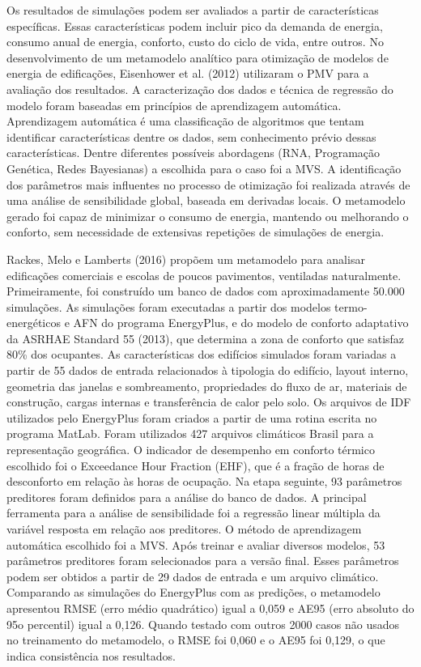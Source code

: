 \documentclass[brazil,hardcopy,openany,a5paper]{ufscthesis}
\begin{document}
	Os resultados de simulações podem ser avaliados a partir de características específicas. Essas características podem incluir pico da demanda de energia, consumo anual de energia, conforto, custo do ciclo de vida, entre outros. No desenvolvimento de um metamodelo analítico para otimização de modelos de energia de edificações, Eisenhower et al. (2012) utilizaram o PMV para a avaliação dos resultados. A caracterização dos dados e técnica de regressão do modelo foram baseadas em princípios de aprendizagem automática. Aprendizagem automática é uma classificação de algoritmos que tentam identificar características dentre os dados, sem conhecimento prévio
	dessas características. Dentre diferentes possíveis abordagens (RNA, Programação Genética, Redes Bayesianas) a escolhida para o caso foi a MVS. 
	A identificação dos parâmetros mais influentes no processo de otimização foi realizada através de uma análise de sensibilidade global, baseada em derivadas locais. O metamodelo gerado foi capaz de minimizar o consumo de energia, mantendo ou melhorando o conforto, sem necessidade de extensivas repetições de simulações de energia.
	
	Rackes, Melo e Lamberts (2016) propõem um metamodelo para analisar edificações comerciais e escolas de poucos pavimentos, ventiladas naturalmente. Primeiramente, foi construído um banco de dados com aproximadamente 50.000 simulações. As simulações foram executadas a partir dos modelos termo-energéticos e AFN do programa EnergyPlus, e do modelo de conforto adaptativo da ASRHAE Standard 55 (2013), que determina a zona de conforto que satisfaz 80\% dos ocupantes. As características dos edifícios simulados foram variadas a partir de 55 dados de entrada relacionados à tipologia do edifício, layout interno, geometria das janelas e sombreamento, propriedades do fluxo de ar, materiais de construção, cargas internas e transferência de calor pelo solo. Os arquivos de IDF utilizados pelo EnergyPlus foram criados a partir de uma rotina escrita no programa MatLab. Foram utilizados 427 arquivos climáticos Brasil para a representação geográfica. O
	indicador de desempenho em conforto térmico escolhido foi o Exceedance Hour Fraction (EHF), que é a fração de horas de desconforto em relação às horas de ocupação. Na etapa seguinte, 93 parâmetros preditores foram definidos para a análise do banco de dados. A principal ferramenta para a análise de sensibilidade foi a regressão linear múltipla da variável resposta em relação aos preditores. O método de aprendizagem automática escolhido foi a MVS. Após treinar e avaliar diversos modelos, 53 parâmetros preditores foram selecionados para a versão final. Esses parâmetros podem ser obtidos a partir de 29 dados de entrada e um arquivo climático. Comparando as simulações do EnergyPlus com as predições, o metamodelo apresentou RMSE (erro médio quadrático) igual a 0,059 e AE95 (erro absoluto do 95o percentil) igual a 0,126. Quando testado com outros 2000 casos não usados no treinamento do metamodelo, o RMSE foi 0,060 e o AE95 foi 0,129, o que indica consistência nos resultados. 
	
\end{document}
